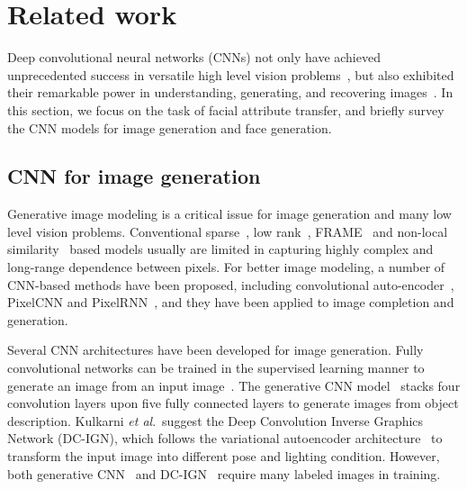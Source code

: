 \documentclass[journal]{IEEEtran}
\newcommand{\etal}{\textit{et al}.}
\begin{document}
\section{Related work}
\label{sec:related}

Deep convolutional neural networks (CNNs) not only have achieved unprecedented success in versatile high level vision problems~\cite{krizhevsky2012imagenet, Parkhi15, girshick2014rich, VQA, zhang2017visual}, but also exhibited their remarkable power in understanding, generating, and recovering images~\cite{goodfellow2014generative,zhu2015learning, mahendran2015understanding,zhang2017beyond,jin2017inverse, du2017stacked}. In this section, we focus on the task of facial attribute transfer, and briefly survey the CNN models for image generation and face generation.


\subsection{CNN for image generation}

Generative image modeling is a critical issue for image generation and many low level vision problems. Conventional sparse~\cite{elad2006image}, low rank~\cite{gu2016wnnm}, FRAME~\cite{zhu1998frame} and non-local similarity~\cite{buades2005nlm,dabov2007BM3D} based models usually are limited in capturing highly complex and long-range dependence between pixels. For better image modeling, a number of CNN-based methods have been proposed, including convolutional auto-encoder~\cite{kulkarni2015deep}, PixelCNN and PixelRNN~\cite{van2016pixel}, and they have been applied to image completion and generation.



Several CNN architectures have been developed for image generation. Fully convolutional networks can be trained in the supervised learning manner to generate an image from an input image~\cite{dong2014learning,long2015fully}.
The generative CNN model~\cite{dosovitskiy2015learning} stacks four convolution layers upon five fully connected layers to generate images from object description.
Kulkarni \etal~suggest the Deep Convolution Inverse Graphics Network (DC-IGN), which follows the variational autoencoder architecture~\cite{kingma2013auto} to transform the input image into different pose and lighting condition.
However, both generative CNN~\cite{dosovitskiy2015learning} and DC-IGN~\cite{kingma2013auto} require many labeled images in training.
\end{document}
